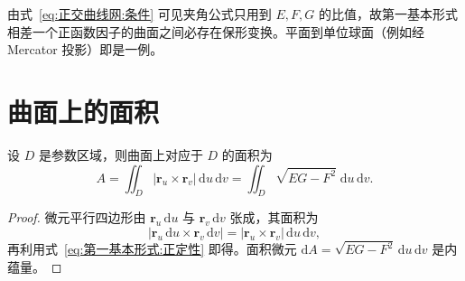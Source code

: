 \begin{remark}
	由式~\eqref{eq:正交曲线网:条件} 可见夹角公式只用到 $E,F,G$ 的比值，故第一基本形式相差一个正函数因子的曲面之间必存在保形变换。平面到单位球面（例如经 Mercator 投影）即是一例。
\end{remark}

\section{曲面上的面积}

\begin{theorem}[面积公式]
	设 $D$ 是参数区域，则曲面上对应于 $D$ 的面积为
	\begin{equation}
		A=\iint_{D}\left|\boldsymbol{r}_u\times\boldsymbol{r}_v\right|\,\mathrm{d}u\,\mathrm{d}v
		=\iint_{D}\sqrt{EG-F^{2}}\;\mathrm{d}u\,\mathrm{d}v.
		\label{eq:面积:公式}
	\end{equation}
\end{theorem}

\begin{proof}
	微元平行四边形由 $\boldsymbol{r}_u\,\mathrm{d}u$ 与 $\boldsymbol{r}_v\,\mathrm{d}v$ 张成，其面积为
	\begin{equation}
		\left|\boldsymbol{r}_u\,\mathrm{d}u\times\boldsymbol{r}_v\,\mathrm{d}v\right|
		=\left|\boldsymbol{r}_u\times\boldsymbol{r}_v\right|\,\mathrm{d}u\,\mathrm{d}v,
		\label{eq:面积:微元}
	\end{equation}
	再利用式~\eqref{eq:第一基本形式:正定性} 即得。面积微元 $\mathrm{d}A=\sqrt{EG-F^{2}}\,\mathrm{d}u\,\mathrm{d}v$ 是内蕴量。
\end{proof}
